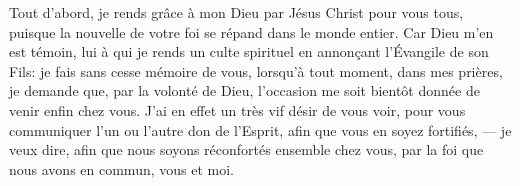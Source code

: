 Tout d’abord, je rends grâce à mon Dieu par Jésus Christ pour vous tous,
	puisque la nouvelle de votre foi se répand dans le monde entier.
Car Dieu m’en est témoin,
	lui à qui je rends un culte spirituel en annonçant l’Évangile de son Fils:
	je fais sans cesse mémoire de vous, lorsqu’à tout moment, dans mes prières,
	je demande que, par la volonté de Dieu,
	l’occasion me soit bientôt donnée de venir enfin chez vous.
J’ai en effet un très vif désir de vous voir,
	pour vous communiquer l’un ou l’autre don de l’Esprit,
	afin que vous en soyez fortifiés,
	--- je veux dire, afin que nous soyons réconfortés ensemble chez vous,
	par la foi que nous avons en commun, vous et moi.

